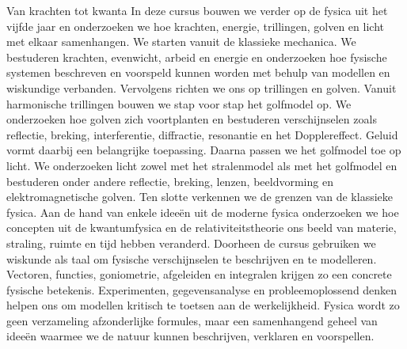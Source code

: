 
\ifdefined\HCode
\else
  \FVDmoduleopening
    {Van krachten tot kwanta}
    {In deze cursus bouwen we verder op de fysica uit het vijfde jaar en onderzoeken we hoe krachten, energie, trillingen, golven en licht met elkaar samenhangen. We starten vanuit de klassieke mechanica. We bestuderen krachten, evenwicht, arbeid en energie en onderzoeken hoe fysische systemen beschreven en voorspeld kunnen worden met behulp van modellen en wiskundige verbanden. Vervolgens richten we ons op trillingen en golven. Vanuit harmonische trillingen bouwen we stap voor stap het golfmodel op. We onderzoeken hoe golven zich voortplanten en bestuderen verschijnselen zoals reflectie, breking, interferentie, diffractie, resonantie en het Dopplereffect. Geluid vormt daarbij een belangrijke toepassing. Daarna passen we het golfmodel toe op licht. We onderzoeken licht zowel met het stralenmodel als met het golfmodel en bestuderen onder andere reflectie, breking, lenzen, beeldvorming en elektromagnetische golven. Ten slotte verkennen we de grenzen van de klassieke fysica. Aan de hand van enkele ideeën uit de moderne fysica onderzoeken we hoe concepten uit de kwantumfysica en de relativiteitstheorie ons beeld van materie, straling, ruimte en tijd hebben veranderd. Doorheen de cursus gebruiken we wiskunde als taal om fysische verschijnselen te beschrijven en te modelleren. Vectoren, functies, goniometrie, afgeleiden en integralen krijgen zo een concrete fysische betekenis. Experimenten, gegevensanalyse en probleemoplossend denken helpen ons om modellen kritisch te toetsen aan de werkelijkheid. Fysica wordt zo geen verzameling afzonderlijke formules, maar een samenhangend geheel van ideeën waarmee we de natuur kunnen beschrijven, verklaren en voorspellen.}
    {%
    }
\fi
